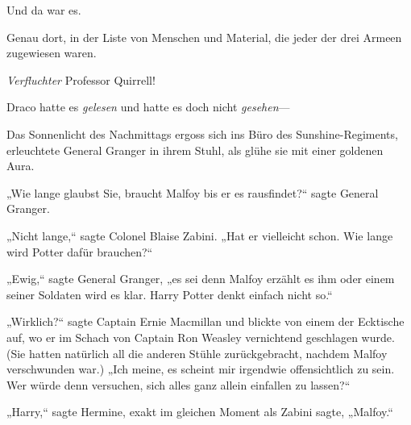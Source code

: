 Und da war es.

Genau dort, in der Liste von Menschen und Material, die jeder der drei Armeen zugewiesen waren.

\emph{Verfluchter} Professor Quirrell!

Draco hatte es \emph{gelesen} und hatte es doch nicht \emph{gesehen}—

\later

Das Sonnenlicht des Nachmittags ergoss sich ins Büro des Sunshine-Regiments, erleuchtete General Granger in ihrem Stuhl, als glühe sie mit einer goldenen Aura.

„Wie lange glaubst Sie, braucht Malfoy bis er es rausfindet?“ sagte General Granger.

„Nicht lange,“ sagte Colonel Blaise Zabini. „Hat er vielleicht schon. Wie lange wird Potter dafür brauchen?“

„Ewig,“ sagte General Granger, „es sei denn Malfoy erzählt es ihm oder einem seiner Soldaten wird es klar. Harry Potter denkt einfach nicht so.“

„Wirklich?“ sagte Captain Ernie Macmillan und blickte von einem der Ecktische auf, wo er im Schach von Captain Ron Weasley vernichtend geschlagen wurde. (Sie hatten natürlich all die anderen Stühle zurückgebracht, nachdem Malfoy verschwunden war.) „Ich meine, es scheint mir irgendwie offensichtlich zu sein. Wer würde denn versuchen, sich alles ganz allein einfallen zu lassen?“

„Harry,“ sagte Hermine, exakt im gleichen Moment als Zabini sagte, „Malfoy.“

